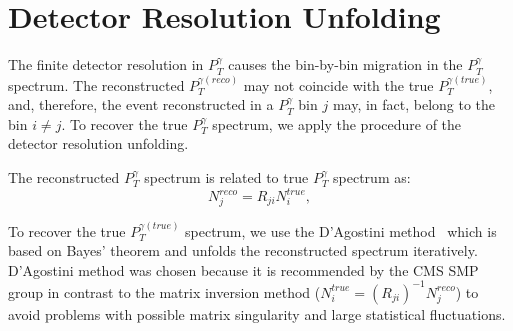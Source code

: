 \section{Detector Resolution Unfolding}
\label{sec:Unfolding}



The finite detector resolution in $P_T^\gamma$ causes the bin-by-bin migration in the $P_T^{\gamma}$ spectrum. The reconstructed $P_T^{\gamma(reco)}$ may not coincide with the true $P_T^{\gamma(true)}$, and, therefore, the event reconstructed in a $P_T^{\gamma}$ bin $j$ may, in fact, belong to the bin $i \neq j$. To recover the true $P_T^{\gamma}$ spectrum, we apply the procedure of the detector resolution unfolding.

The reconstructed $P_T^{\gamma}$ spectrum is related to true $P_T^{\gamma}$ spectrum as:
\begin{equation}
  N^{reco}_{j} = R_{ji} N^{true}_{i},
\end{equation}

To recover the true $P_T^{\gamma(true)}$ spectrum, we use the D'Agostini method~\cite{ref_DAgostini} which is based on Bayes' theorem and unfolds the reconstructed spectrum iteratively. D'Agostini method was chosen because it is recommended by the CMS SMP group in contrast to the matrix inversion method ($N^{true}_{i} = \left( R_{ji} \right) ^{-1} N^{reco}_{j}$) to avoid problems with possible matrix singularity and large statistical fluctuations.


